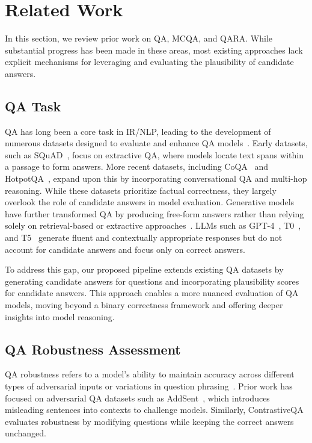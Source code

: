 \section{Related Work}
\label{s:related_work}
In this section, we review prior work on QA, MCQA, and QARA. While substantial progress has been made in these areas, most existing approaches lack explicit mechanisms for leveraging and evaluating the plausibility of candidate answers.

\subsection{QA Task}
QA has long been a core task in IR/NLP, leading to the development of numerous datasets designed to evaluate and enhance QA models~\cite{serban-etal-2016-generating, 2017arXiv170405179D, reddy-etal-2019-coqa, kwiatkowski-etal-2019-natural}. Early datasets, such as SQuAD~\cite{rajpurkar-etal-2016-squad}, focus on extractive QA, where models locate text spans within a passage to form answers. More recent datasets, including CoQA~\cite{reddy-etal-2019-coqa} and HotpotQA~\cite{yang-etal-2018-hotpotqa}, expand upon this by incorporating conversational QA and multi-hop reasoning. While these datasets prioritize factual correctness, they largely overlook the role of candidate answers in model evaluation.
Generative models have further transformed QA by producing free-form answers rather than relying solely on retrieval-based or extractive approaches~\cite{lewis-etal-2020-bart, NEURIPS2020_1457c0d6}. LLMs such as GPT-4~\cite{2023arXiv230308774O}, T0~\cite{sanh2022multitask}, and T5~\cite{10.5555/3455716.3455856} generate fluent and contextually appropriate responses but do not account for candidate answers and focus only on correct answers.

To address this gap, our proposed pipeline extends existing QA datasets by generating candidate answers for questions and incorporating plausibility scores for candidate answers. This approach enables a more nuanced evaluation of QA models, moving beyond a binary correctness framework and offering deeper insights into model reasoning.

\subsection{QA Robustness Assessment}
QA robustness refers to a model’s ability to maintain accuracy across different types of adversarial inputs or variations in question phrasing~\cite{jia-liang-2017-adversarial,Kaushik2020Learning}. Prior work has focused on adversarial QA datasets such as AddSent~\cite{jia-liang-2017-adversarial}, which introduces misleading sentences into contexts to challenge models. Similarly, ContrastiveQA~\cite{gardner-etal-2020-evaluating} evaluates robustness by modifying questions while keeping the correct answers unchanged. 

